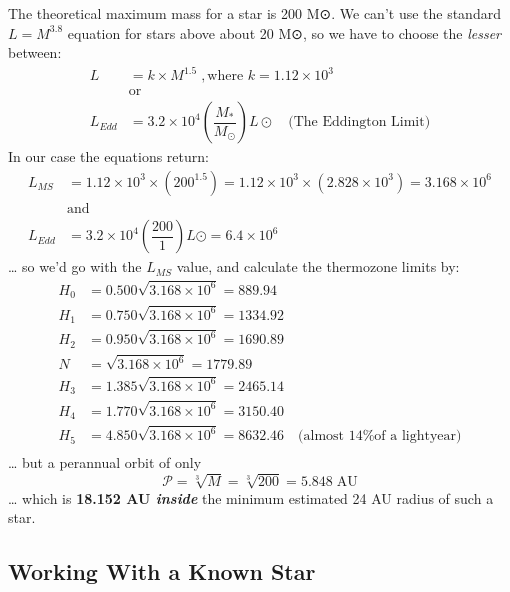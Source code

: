 \documentclass[
  letterpaper,
]{book}
\begin{document}
The theoretical maximum mass for a star is 200 M⊙. We can't use the
standard \(L=M^{3.8}\) equation for stars above about 20 M⊙, so we have
to choose the \emph{lesser} between: \[
\begin{align}
L &= k \times M^{1.5}\;, \text{where } k=1.12 \times10^3 \\[1em]
&\text{or} \\
L_{Edd} &= 3.2 \times 10^4 \left(\dfrac{M_*}{M_⊙}\right)L⊙ \quad \text{(The Eddington Limit)} 
\end{align}
\] In our case the equations return: \[
\begin{align}
L_{MS} &= 1.12 \times 10^3 \times (200^{1.5}) = 1.12 \times 10^3 \times (2.828 \times 10^3) = 3.168 \times 10^6 \\[1em]
&\text{and} \\
L_{Edd} &= 3.2 \times 10^4 \left(\dfrac{200}{1}\right)L⊙ = 6.4 \times 10^6
\end{align}
\] \ldots{} so we'd go with the \(L_{MS}\) value, and calculate the
thermozone limits by: \[
\begin{align}
H_0 &= 0.500\sqrt{3.168 \times 10^6} = 889.94 \\
H_1 &= 0.750\sqrt{3.168 \times 10^6} = 1334.92 \\
H_2 &= 0.950\sqrt{3.168 \times 10^6} = 1690.89 \\
N &= \sqrt{3.168 \times 10^6} = 1779.89 \\
H_3 &= 1.385\sqrt{3.168 \times 10^6} = 2465.14 \\
H_4 &= 1.770\sqrt{3.168 \times 10^6} = 3150.40 \\
H_5 &= 4.850\sqrt{3.168 \times 10^6} = 8632.46 \quad \text{(almost 14\% of a lightyear)} \\
\end{align}
\] \ldots{} but a perannual orbit of only \[
\mathcal{P} = \sqrt[3]{M} = \sqrt[3]{200} = 5.848\;\text{AU}
\] \ldots{} which is \textbf{18.152 AU \emph{inside}} the minimum
estimated 24 AU radius of such a star.

\subsection{Working With a Known Star}\label{working-with-a-known-star}
\end{document}
